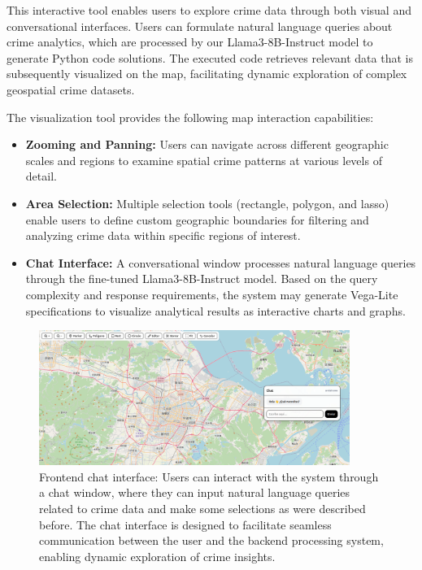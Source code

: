 This interactive tool enables users to explore crime data through both visual and conversational interfaces. Users can formulate natural language queries about crime analytics, which are processed by our Llama3-8B-Instruct model to generate Python code solutions. The executed code retrieves relevant data that is subsequently visualized on the map, facilitating dynamic exploration of complex geospatial crime datasets.

The visualization tool provides the following map interaction capabilities:
\begin{itemize}
  \item \textbf{Zooming and Panning:} Users can navigate across different geographic scales and regions to examine spatial crime patterns at various levels of detail.
  \item \textbf{Area Selection:} Multiple selection tools (rectangle, polygon, and lasso) enable users to define custom geographic boundaries for filtering and analyzing crime data within specific regions of interest.
  \item \textbf{Chat Interface:} A conversational window processes natural language queries through the fine-tuned Llama3-8B-Instruct model. Based on the query complexity and response requirements, the system may generate Vega-Lite specifications to visualize analytical results as interactive charts and graphs.
\end{itemize}

\begin{figure}[H]
  \centering
  \includegraphics[width=0.9\textwidth]{images/frontend_chat.png}
  \caption{Frontend chat interface: Users can interact with the system through a chat window, where they can input natural language queries related to crime data and make some selections as were described before. The chat interface is designed to facilitate seamless communication between the user and the backend processing system, enabling dynamic exploration of crime insights.}
  \label{fig:frontend_chat_interface}
\end{figure}
